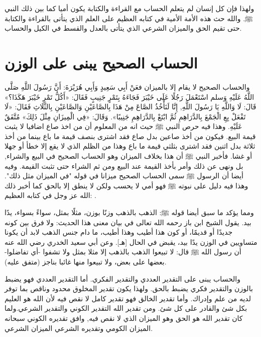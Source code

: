ولهذا فإن كل إنسان لم يتعلم الحساب مع القراءة والكتابة يكون أميا كما بين ذلك النبي ﷺ. والله حث هذه الأمة الأمية في كتابه العظيم على العلم الذي يتأتى بالقراءة والكتابة حتى تقيم الحق والميزان الشرعي الذي يتأتى بالعدل والقسط في الكيل والحساب.


\section{الحساب الصحيح يبنى على الوزن}

والحساب الصحيح لا يقام إلا بالميزان فعَنْ أَبِي سَعِيدٍ وَأَبِي هُرَيْرَةَ: أَنَّ رَسُولَ اللَّهِ صَلَّى اللَّهُ عَلَيْهِ وَسلم اسْتَعْمَلَ رَجُلًا عَلَى خَيْبَرَ فَجَاءَهُ بِتَمْرٍ جَنِيبٍ فَقَالَ: «أَكُلُّ تَمْرِ خَيْبَرَ هَكَذَا؟» قَالَ: لَا وَاللَّهِ يَا رَسُولَ اللَّهِ, إِنَّا لَنَأْخُذُ الصَّاعَ مِنْ هَذَا بِالصَّاعَيْنِ وَالصَّاعَيْنِ بِالثَّلَاثِ فَقَالَ: «لَا تَفْعَلْ بِعِ الْجَمْعَ بِالدَّرَاهِمِ ثُمَّ ابْتَعْ بِالدَّرَاهِمِ جَنِيبًا». وَقَالَ: «فِي الْمِيزَانِ مِثْلَ ذَلِكَ»
{\footnotesize مُتَّفَقٌ عَلَيْهِ}.
وهذا فيه حرص النبي ﷺ حيث انه من المعلوم أن من اخذ صاع اضافيا لا يثبت قيمة البيع. فيكون من أخذ صاعين بدل صاع فقد اشترى بنصف قيمة ما باع بينما من أخذ ثلاثة بدل اثنين فقد اشترى بثلثي قيمة ما باع وهذا من الظلم الذي لا يقع إلا خطأ أو جهلا أو غشا. فأخبر النبي ﷺ أن هذا بخلاف الميزان وهو الحساب الصحيح في البيع والشراء, بل ونهى عن ذلك وأمر بأخذ القيمة عند البيع ومن ثم الشراء حتى تثبت القيمة. وفيه أيضا أن الرسول ﷺ سمى الحساب الصحيح ميزانا في قوله "في الميزان مثل ذلك". وهذا فيه دليل على نبوته ﷺ فهو أمي لا يحسب ولكن لا ينطق إلا بالحق كما أخبر ذلك الله عز وجل في كتابه العظيم:
\quranayah*[53][3-4]{\footnotesize \surahname*[53]}.

ومما يؤكد ما سبق أيضا قوله ﷺ:
الذهب بالذهب وزنًا بوزن، مثلًا بمثل، سواءً بسواء، يدًا بيد.
يقول الشيخ ابن باز رحمه الله تعالى في بيان معنى هذا الحديث: ولا فرق بين كونه جديدًا أو قديمًا، أو كون هذا أطيب وهذا أطيب، ما دام جنس الذهب لابد أن يكونا متساويين في الوزن يدًا بيد، يقبض في الحال [هـ]. وعن أبي سعيد الخدري رضي الله عنه أن رسول الله ﷺ قال: لا تبيعوا الذهب بالذهب إلا مثلا بمثل ولا تشفوا -أي تفاضلوا- بعضها على بعض، ولا تبيعوا منها غائبا بناجز
{\footnotesize (متفق عليه)}.

والحساب يبنى على التقدير العددي والتقدير الفكري. أما التقدير العددي فهو يضبط بالوزن والتقدير فكري يضبط بالحق. ولهذا يكون تقدير المخلوق محدود وناقص بما توفر لديه من علم وإدراك. وأما تقدير الخالق فهو تقدير كامل لا نقص فيه لأن الله هو العليم بكل شئ والقادر على كل شئ. ومن تقدير الله التقدير الكوني والتقدير الشرعي.ولما كان تقدير الله هو الحق وهو الميزان الذي لا نقص فيه, وافق تقديره الكوني سبحانه الميزان الكومي وتقديره الشرعي الميزان الشرعي.

